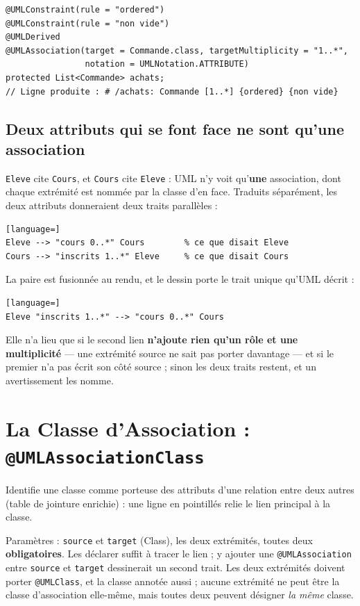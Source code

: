 \documentclass[12pt, a4paper]{article}
\begin{document}
\begin{lstlisting}
@UMLConstraint(rule = "ordered")
@UMLConstraint(rule = "non vide")
@UMLDerived
@UMLAssociation(target = Commande.class, targetMultiplicity = "1..*",
                notation = UMLNotation.ATTRIBUTE)
protected List<Commande> achats;
// Ligne produite : # /achats: Commande [1..*] {ordered} {non vide}
\end{lstlisting}

\subsection{Deux attributs qui se font face ne sont qu'une association}
\label{sec:reciproques}

\texttt{Eleve} cite \texttt{Cours}, et \texttt{Cours} cite \texttt{Eleve} : UML n'y voit qu'\textbf{une} association, dont chaque extrémité est nommée par la classe d'en face. Traduits séparément, les deux attributs donneraient deux traits parallèles :

\begin{lstlisting}[language=]
Eleve --> "cours 0..*" Cours        % ce que disait Eleve
Cours --> "inscrits 1..*" Eleve     % ce que disait Cours
\end{lstlisting}

La paire est fusionnée au rendu, et le dessin porte le trait unique qu'UML décrit :

\begin{lstlisting}[language=]
Eleve "inscrits 1..*" --> "cours 0..*" Cours
\end{lstlisting}

Elle n'a lieu que si le second lien \textbf{n'ajoute rien qu'un rôle et une multiplicité} --- une extrémité source ne sait pas porter davantage --- et si le premier n'a pas écrit son côté source ; sinon les deux traits restent, et un avertissement les nomme.

\section{La Classe d'Association : \texttt{@UMLAssociationClass}}

Identifie une classe comme porteuse des attributs d'une relation entre deux autres (table de jointure enrichie) : une ligne en pointillés relie le lien principal à la classe.

Paramètres : \texttt{source} et \texttt{target} (Class), les deux extrémités, toutes deux \textbf{obligatoires}. Les déclarer suffit à tracer le lien ; y ajouter une \texttt{@UMLAssociation} entre \texttt{source} et \texttt{target} dessinerait un second trait. Les deux extrémités doivent porter \texttt{@UMLClass}, et la classe annotée aussi ; aucune extrémité ne peut être la classe d'association elle-même, mais toutes deux peuvent désigner \textit{la même} classe.
\end{document}
